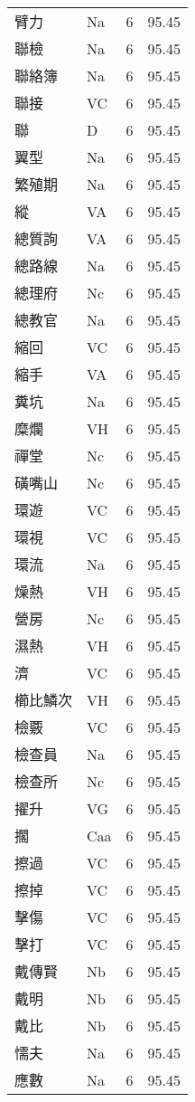 \documentclass[twocolumn]{book}
\begin{document}
\begin{supertabular}{llrr}
臂力 & Na & 6 &  95.45\\
聯檢 & Na & 6 &  95.45\\
聯絡簿 & Na & 6 &  95.45\\
聯接 & VC & 6 &  95.45\\
聯 & D & 6 &  95.45\\
翼型 & Na & 6 &  95.45\\
繁殖期 & Na & 6 &  95.45\\
縱 & VA & 6 &  95.45\\
總質詢 & VA & 6 &  95.45\\
總路線 & Na & 6 &  95.45\\
總理府 & Nc & 6 &  95.45\\
總教官 & Na & 6 &  95.45\\
縮回 & VC & 6 &  95.45\\
縮手 & VA & 6 &  95.45\\
糞坑 & Na & 6 &  95.45\\
糜爛 & VH & 6 &  95.45\\
禪堂 & Nc & 6 &  95.45\\
磺嘴山 & Nc & 6 &  95.45\\
環遊 & VC & 6 &  95.45\\
環視 & VC & 6 &  95.45\\
環流 & Na & 6 &  95.45\\
燥熱 & VH & 6 &  95.45\\
營房 & Nc & 6 &  95.45\\
濕熱 & VH & 6 &  95.45\\
濟 & VC & 6 &  95.45\\
櫛比鱗次 & VH & 6 &  95.45\\
檢覈 & VC & 6 &  95.45\\
檢查員 & Na & 6 &  95.45\\
檢查所 & Nc & 6 &  95.45\\
擢升 & VG & 6 &  95.45\\
擱 & Caa & 6 &  95.45\\
擦過 & VC & 6 &  95.45\\
擦掉 & VC & 6 &  95.45\\
擊傷 & VC & 6 &  95.45\\
擊打 & VC & 6 &  95.45\\
戴傳賢 & Nb & 6 &  95.45\\
戴明 & Nb & 6 &  95.45\\
戴比 & Nb & 6 &  95.45\\
懦夫 & Na & 6 &  95.45\\
應數 & Na & 6 &  95.45\\

\end{supertabular}
\end{document}
